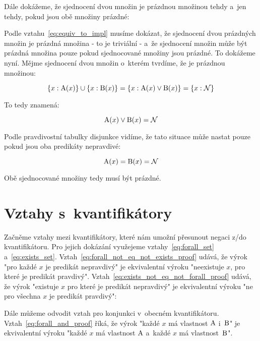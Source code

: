 

Dále dokážeme, že sjednocení dvou množin je prázdnou množinou tehdy a~jen tehdy, pokud jsou obě množiny prázdné:


Podle vztahu~\eqref{eq:equiv_to_impl} musíme dokázat, že sjednocení dvou prázdných množin je prázdná množina - to je triviální - a~že sjednocení množin může být prázdná množina pouze pokud sjednocované množiny jsou prázdné. To dokážeme nyní. Mějme sjednocení dvou množin o~kterém tvrdíme, že je prázdnou množinou:

\begin{equation}
\{x: \mathrm{A}(x)\} \cup \{x: \mathrm{B}(x)\} = \{x: \mathrm{A}(x) \lor \mathrm{B}(x)\} = \{x: \mathcal{N}\}
\end{equation}

To tedy znamená:

\begin{equation}
\mathrm{A}(x) \lor \mathrm{B}(x) = \mathcal{N}
\end{equation}

Podle pravdivostní tabulky disjunkce vidíme, že tato situace může nastat pouze pokud jsou oba predikáty nepravdivé:

\begin{equation}
\mathrm{A}(x) = \mathrm{B}(x) = \mathcal{N}
\end{equation}

Obě sjednocované množiny tedy musí být prázdné.

\section{Vztahy s~kvantifikátory}

Začněme vztahy mezi kvantifikátory, které nám umožní přesunout negaci z/do kvantifikátoru. Pro jejich dokázání využejeme
vztahy~\eqref{eq:forall_set} a~\eqref{eq:exists_set}. Vztah~\eqref{eq:forall_not_eq_not_exists_proof} udává, že výrok "pro každé \(x\) je predikát nepravdivý" je ekvivalentní výroku "neexistuje \(x\), pro které je predikát pravdivý". Vztah~\eqref{eq:exists_not_eq_not_forall_proof} udává, že výrok "existuje \(x\) pro které je predikát nepravdivý" je ekvivalentní výroku "ne pro všechna \(x\) je predikát pravdivý":


Dále můžeme odvodit vztah pro konjunkci v~obecném kvantifikátoru. Vztah~\eqref{eq:forall_and_proof} říká, že výrok "každé \(x\) má vlastnost \(\mathrm{A}\) i~\(\mathrm{B}\)" je ekvivalentní výroku "každé \(x\) má vlastnost \(\mathrm{A}\) a~každé \(x\) má vlastnost~\(\mathrm{B}\)".

